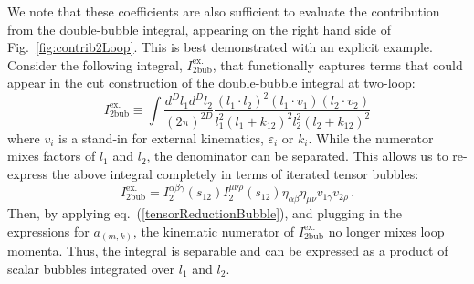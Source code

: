 \documentclass[12pt,letter]{article}
\def\Fig#1{fig.~{\ref{#1}}}
\def\Fig#1{Fig.~{\ref{#1}}}
\def\eqn#1{eq.~(\ref{#1})}
\begin{document}
We note that these coefficients are also sufficient to evaluate the contribution from the double-bubble integral, appearing on the right hand side of \Fig{fig:contrib2Loop}. This is best demonstrated with an explicit example. Consider the following integral, $I^{\text{ex}.}_{\text{2bub}}$, that functionally captures terms that could appear in the cut construction of the double-bubble integral at two-loop:
\begin{equation}
I^{\text{ex}.}_{\text{2bub}} \equiv \int \frac{d^D l_{1}d^D l_{2}}{(2\pi)^{2D}} \frac{(l_1\!\cdot\! l_2)^2(l_1\!\cdot\! v_1)(l_2\!\cdot\! v_2)}{l_1^2(l_1+k_{12})^2 l_2^2(l_2+k_{12})^2}
\end{equation}
where $v_i$ is a stand-in for external kinematics, $\varepsilon_i$ or $k_i$. While the numerator mixes factors of $l_1$ and $l_2$, the denominator can be separated. This allows us to re-express the above integral completely in terms of iterated tensor bubbles:
\begin{equation}
I^{\text{ex}.}_{\text{2bub}} = I_{2}^{\alpha\beta\gamma}(s_{12}) I_2^{\mu\nu\rho}(s_{12})\eta_{\alpha\beta}\eta_{\mu\nu}v_{1 \gamma}v_{2 \rho}\,.
\end{equation}
Then, by applying \eqn{tensorReductionBubble}, and plugging in the expressions for $a_{(m,k)}$, the kinematic numerator of $I^{\text{ex}.}_{\text{2bub}}$ no longer mixes loop momenta. Thus, the integral is separable and can be expressed as a product of scalar bubbles integrated over $l_1$ and $l_2$. 
\end{document}
